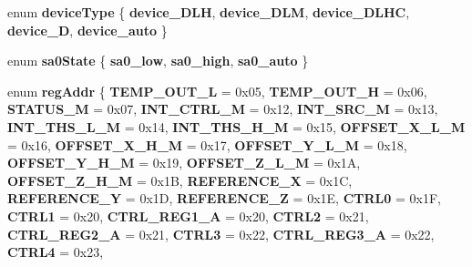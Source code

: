 \begin{DoxyCompactItemize}
\item 
\mbox{\label{class_l_s_m303_a8aa2d6395884e89c11f2204111bc53f8}} 
enum {\bfseries device\+Type} \{ \newline
{\bfseries device\+\_\+\+D\+LH}, 
{\bfseries device\+\_\+\+D\+LM}, 
{\bfseries device\+\_\+\+D\+L\+HC}, 
{\bfseries device\+\_\+D}, 
\newline
{\bfseries device\+\_\+auto}
 \}
\item 
\mbox{\label{class_l_s_m303_a56dfb5bd3b4ec1bd311d247924cc54c1}} 
enum {\bfseries sa0\+State} \{ {\bfseries sa0\+\_\+low}, 
{\bfseries sa0\+\_\+high}, 
{\bfseries sa0\+\_\+auto}
 \}
\item 
\mbox{\label{class_l_s_m303_aec959b54c433194ac47239d613ab9875}} 
enum {\bfseries reg\+Addr} \{ \newline
{\bfseries T\+E\+M\+P\+\_\+\+O\+U\+T\+\_\+L} = 0x05, 
{\bfseries T\+E\+M\+P\+\_\+\+O\+U\+T\+\_\+H} = 0x06, 
{\bfseries S\+T\+A\+T\+U\+S\+\_\+M} = 0x07, 
{\bfseries I\+N\+T\+\_\+\+C\+T\+R\+L\+\_\+M} = 0x12, 
\newline
{\bfseries I\+N\+T\+\_\+\+S\+R\+C\+\_\+M} = 0x13, 
{\bfseries I\+N\+T\+\_\+\+T\+H\+S\+\_\+\+L\+\_\+M} = 0x14, 
{\bfseries I\+N\+T\+\_\+\+T\+H\+S\+\_\+\+H\+\_\+M} = 0x15, 
{\bfseries O\+F\+F\+S\+E\+T\+\_\+\+X\+\_\+\+L\+\_\+M} = 0x16, 
\newline
{\bfseries O\+F\+F\+S\+E\+T\+\_\+\+X\+\_\+\+H\+\_\+M} = 0x17, 
{\bfseries O\+F\+F\+S\+E\+T\+\_\+\+Y\+\_\+\+L\+\_\+M} = 0x18, 
{\bfseries O\+F\+F\+S\+E\+T\+\_\+\+Y\+\_\+\+H\+\_\+M} = 0x19, 
{\bfseries O\+F\+F\+S\+E\+T\+\_\+\+Z\+\_\+\+L\+\_\+M} = 0x1A, 
\newline
{\bfseries O\+F\+F\+S\+E\+T\+\_\+\+Z\+\_\+\+H\+\_\+M} = 0x1B, 
{\bfseries R\+E\+F\+E\+R\+E\+N\+C\+E\+\_\+X} = 0x1C, 
{\bfseries R\+E\+F\+E\+R\+E\+N\+C\+E\+\_\+Y} = 0x1D, 
{\bfseries R\+E\+F\+E\+R\+E\+N\+C\+E\+\_\+Z} = 0x1E, 
\newline
{\bfseries C\+T\+R\+L0} = 0x1F, 
{\bfseries C\+T\+R\+L1} = 0x20, 
{\bfseries C\+T\+R\+L\+\_\+\+R\+E\+G1\+\_\+A} = 0x20, 
{\bfseries C\+T\+R\+L2} = 0x21, 
\newline
{\bfseries C\+T\+R\+L\+\_\+\+R\+E\+G2\+\_\+A} = 0x21, 
{\bfseries C\+T\+R\+L3} = 0x22, 
{\bfseries C\+T\+R\+L\+\_\+\+R\+E\+G3\+\_\+A} = 0x22, 
{\bfseries C\+T\+R\+L4} = 0x23, 
\newline

\end{DoxyCompactItemize}
